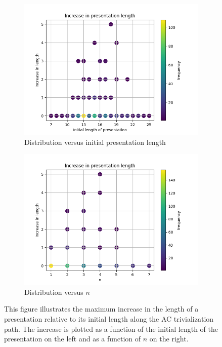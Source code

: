 \begin{figure}
	\centering
	\begin{subfigure}[b]{0.5\textwidth}
		\includegraphics[width=\textwidth]{fig/gs_length_increase_vs_length.png}
		\caption{Distribution versus initial presentation length}
		\label{fig:gs_length_increase_vs_length}
	\end{subfigure}%
	\begin{subfigure}[b]{0.5\textwidth}
		\centering
		\includegraphics[width=1.1\textwidth]{fig/gs_length_increase_vs_n.png}
		\caption{Distribution versus $n$}
		\label{fig:gs_length_increase_vs_n}
	\end{subfigure}
	\caption{
		This figure illustrates the maximum increase in the length of a presentation relative to its initial length along the AC trivialization path.
		The increase is plotted as a function of the initial length of the presentation on the left and as a function of $n$ on the right.} \label{fig:gs_length_increase}
\end{figure}

